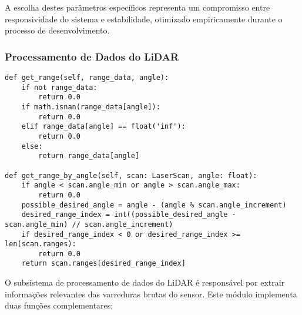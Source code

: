 A escolha destes parâmetros específicos representa um compromisso entre
responsividade do sistema e estabilidade, otimizado empiricamente durante o
processo de desenvolvimento.

\subsubsection{Processamento de Dados do LiDAR}

\begin{verbatim}
def get_range(self, range_data, angle):
    if not range_data:
        return 0.0
    if math.isnan(range_data[angle]):
        return 0.0
    elif range_data[angle] == float('inf'):
        return 0.0
    else:
        return range_data[angle]

def get_range_by_angle(self, scan: LaserScan, angle: float): 
    if angle < scan.angle_min or angle > scan.angle_max:
        return 0.0
    possible_desired_angle = angle - (angle % scan.angle_increment)
    desired_range_index = int((possible_desired_angle - scan.angle_min) // scan.angle_increment)
    if desired_range_index < 0 or desired_range_index >= len(scan.ranges):
        return 0.0
    return scan.ranges[desired_range_index]
\end{verbatim}

O subsistema de processamento de dados do LiDAR é responsável por extrair
informações relevantes das varreduras brutas do sensor. Este módulo implementa
duas funções complementares:


